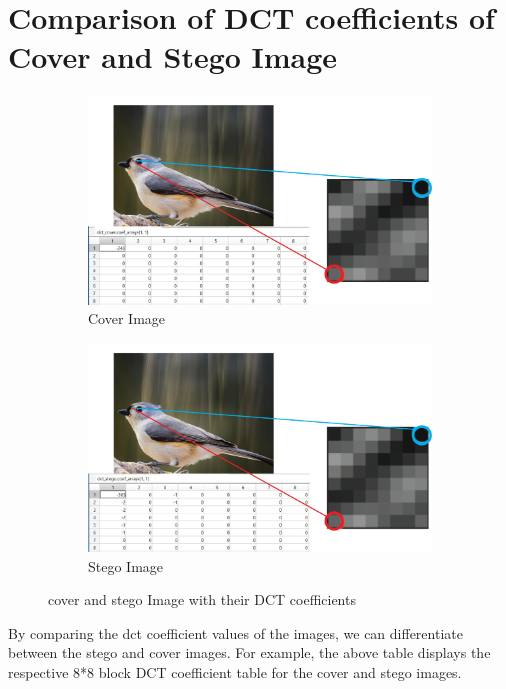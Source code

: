\section{Comparison of DCT coefficients of Cover and Stego Image}
\begin{figure}[H]
    \centering
    \begin{subfigure}[b]{0.7\textwidth}
        \centering
        \includegraphics[width=\textwidth]{img/cover.jpg}
        \caption{Cover Image}
    \end{subfigure}
    \hfill
    \begin{subfigure}[b]{0.7\textwidth}
        \centering
        \includegraphics[width=\textwidth]{img/stego.jpg}
        \caption{Stego Image}
    \end{subfigure}
    \caption{cover and stego Image with their DCT coefficients}
\end{figure}
By comparing the dct coefficient values of the images, we can differentiate between the stego and cover images. For example, the above table displays the respective 8*8 block DCT coefficient table for the cover and stego images.\\
